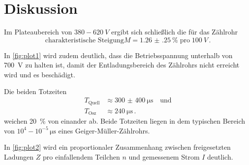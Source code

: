 \section{Diskussion}
\label{sec:Diskussion}

Im Plateaubereich von $380 - \qty{620}{V}$ ergibt sich schließlich die für das Zählrohr 
\begin{equation*}
    \text{charakteristische Steigung}
    M = \qty{1.26(25)}{\percent} \; \text{pro} \; \qty{100}{V} \, .
\end{equation*}

In \autoref{fig:plot1} wird zudem deutlich, dass die Betriebsspannung unterhalb von \qty{700}{V}
zu halten ist, damit der Entladungsbereich des Zählrohrs nicht erreicht wird und es beschädigt.

Die beiden Totzeiten
\begin{align*}
    T_\text{Quell} &\approx \qty{300(400)}{\micro\second} \quad \text{und} \\
    T_\text{Osz} &\approx \qty{240}{\micro\second} \, .
\end{align*}
weichen \qty{20}{\percent} von einander ab. 
Beide Totzeiten liegen in dem typischen Bereich von $10^{4} - 10^{-5} \, \unit{\micro\second}$ eines Geiger-Müller-Zählrohrs.

In \autoref{fig:plot2} wird ein proportionaler Zusammenhang zwischen
freigesetzten Ladungen $Z$ pro einfallendem Teilchen $n$ und gemessenem Strom $I$ deutlich.